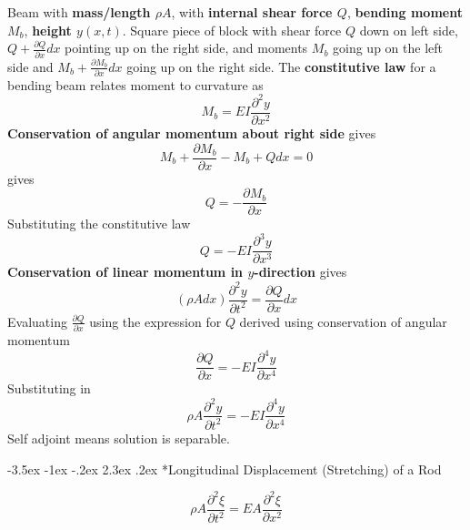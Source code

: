 \documentclass[letterpaper,twocolumn,notitlepage]{article}
\makeatletter
\renewcommand\subsection{\@startsection{section}{1}{\z@}%
 {-3.5ex \@plus-1ex \@minus-.2ex}%
 {2.3ex \@plus.2ex}%
 {\fontsize{8pt}{8pt}\selectfont\sffamily}}
\makeatother
\begin{document}
   Beam with \textbf{mass/length $\rho A$}, with \textbf{internal shear force $Q$}, \textbf{bending moment $M_{b}$}, \textbf{height $y(x,t)$}.
   Square piece of block with shear force $Q$ down on left side, $Q+\frac{\partial Q}{\partial x}dx$ pointing up on the right side, and moments $M_{b}$ going up on the left side and $M_{b}+\frac{\partial M_{b}}{\partial x}dx$ going up on the right side.
   The \textbf{constitutive law} for a bending beam relates moment to curvature as
  \begin{equation*}
    \boxed{M_{b}=EI\frac{\partial^{2}y}{\partial x^{2}}}
  \end{equation*}
  \textbf{Conservation of angular momentum about right side} gives
  \begin{equation*}
    M_{b}+\frac{\partial M_{b}}{\partial x}-M_{b}+Qdx=0
  \end{equation*}
  gives
  \begin{equation*}
    \boxed{Q=-\frac{\partial M_{b}}{\partial x}}
  \end{equation*}
  Substituting the constitutive law
  \begin{equation*}
    Q=-EI\frac{\partial^{3}y}{\partial x^{3}}
  \end{equation*}
  \textbf{Conservation of linear momentum in $y$-direction} gives
  \begin{equation*}
    (\rho Adx)\frac{\partial^{2}y}{\partial t^{2}}=\frac{\partial Q}{\partial x}dx
  \end{equation*}
  Evaluating $\frac{\partial Q}{\partial x}$ using the expression for $Q$ derived using conservation of angular momentum
  \begin{equation*}
    \frac{\partial Q}{\partial x}=-EI\frac{\partial^{4}y}{\partial x^{4}}
  \end{equation*}
  Substituting in
  \begin{equation*}
    \boxed{\rho A\frac{\partial^{2}y}{\partial t^{2}}=-EI\frac{\partial^{4}y}{\partial x^{4}}}
  \end{equation*}
  Self adjoint means solution is separable.

  \subsection*{Longitudinal Displacement (Stretching) of a Rod}

  \begin{equation*}
    \boxed{\rho A\frac{\partial^{2}\xi}{\partial t^{2}}=EA\frac{\partial^{2}\xi}{\partial x^{2}}}
  \end{equation*}
\end{document}
